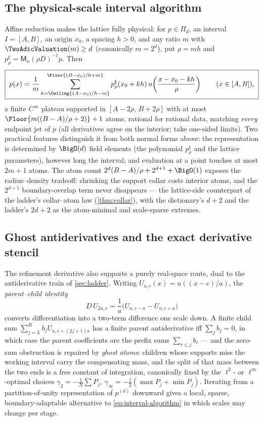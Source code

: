 \documentclass[11pt,oneside]{article}
\numberwithin{equation}{section}
\theoremstyle{definition}
\theoremstyle{remark}
\newcommand{\MM}{\mathsf M}
\newcommand{\PiD}{\Pi_d}
\begin{document}
\subsection{The physical-scale interval algorithm}

Affine reduction makes the lattice fully physical: for
$p\in\PiD$, an interval $I=[A,B]$, an origin $x_0$, a spacing $h>0$,
and any ratio $m$ with $\TwoAdicValuation(m)\ge d$ (canonically $m=2^{d}$), put
$\rho=mh$ and
$p^{\sharp}_\rho=\MM_u(\rho D)^{-1}p$.  Then
\begin{equation}
 \boxed{\;
 p(x)=\frac1m
 \sum_{k=\Ceiling{(A-x_0)/h-m}}^{\Floor{(B-x_0)/h+m}}
 p^{\sharp}_\rho(x_0+kh)\,
 u\!\left(\frac{x-x_0-kh}{\rho}\right)
 \qquad(x\in[A,B]),
 \;}
 \label{eq:interval-algorithm}
\end{equation}
a finite $C^\infty$ plateau supported in $[A-2\rho,\,B+2\rho]$ with
at most $\Floor{m((B-A)/\rho+2)}+1$ atoms, rational for rational
data, matching \emph{every} endpoint jet of $p$ (all derivatives
agree on the interior; take one-sided limits).  Two practical
features distinguish it from both normal forms above: the
representation is determined by $\BigO(d)$ field elements (the
polynomial $p^{\sharp}_\rho$ and the lattice parameters), however
long the interval; and evaluation at a point touches at most
$2m+1$ atoms.  The atom count
$2^{d}(B-A)/\rho+2^{d+1}+\BigO(1)$ exposes the radius--density
tradeoff: shrinking the support collar costs interior atoms, and the
$2^{d+1}$ boundary-overlap term never disappears --- the lattice-side
counterpart of the ladder's collar--atom law
(\cref{thm:collar}), with the dictionary's $d+2$ and the ladder's
$2d+2$ as the atom-minimal and scale-sparse extremes.

\subsection{Ghost antiderivatives and the exact derivative stencil}

The refinement derivative also supports a purely real-space route,
dual to the antiderivative train of \cref{sec:ladder}.  Writing
$U_{a,c}(x)=u((x-c)/a)$, the \emph{parent--child identity}
\begin{equation}
 D\,U_{2a,c}
 =\frac1a\bigl(U_{a,c-a}-U_{a,c+a}\bigr)
 \label{eq:parent-child}
\end{equation}
converts differentiation into a two-term difference one scale down.
A finite child sum $\sum_{j=L}^{R}b_jU_{a,c+(2j+1)a}$ has a finite
parent antiderivative iff $\sum_jb_j=0$, in which case the parent
coefficients are the prefix sums $\sum_{r\le j}b_r$ --- and the
zero-sum obstruction is repaired by \emph{ghost atoms}: children
whose supports miss the working interval carry the compensating
mass, and the split of that mass between the two ends is a free
constant of integration, canonically fixed by the
$\ell^{2}$- or $\ell^\infty$-optimal choices
$\gamma_2=-\frac1N\sum P_j$,
$\gamma_\infty=-\tfrac12(\max P_j+\min P_j)$.  Iterating from a
partition-of-unity representation of $p^{(d)}$ downward gives a
local, sparse, boundary-adaptable alternative to
\eqref{eq:interval-algorithm} in which scales may change per stage.
\end{document}
